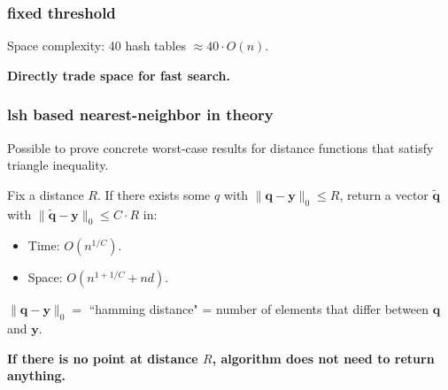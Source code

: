 \documentclass[compress]{beamer}
\newcommand{\bv}[1]{\mathbf{#1}}
\begin{document}
\begin{frame}
	\frametitle{fixed threshold}
	\begin{center}
	Space complexity: 40 hash tables \alert{$\approx 40\cdot O(n)$}. 
	
	\textbf{Directly trade space for fast search.}
	\end{center}
\end{frame}

\begin{frame}
	\frametitle{lsh based nearest-neighbor in theory}
	Possible to prove concrete worst-case results for distance functions that satisfy triangle inequality. 
	\begin{theorem}
		Fix a distance $R$. If there exists some $q$ with $\|\bv{q} - \bv{y}\|_0 \leq R$, return a vector $\tilde{\bv{q}}$ with $\|\tilde{\bv{q}} - \bv{y}\|_0 \leq C\cdot R$ in:
		\begin{itemize}
			\item Time: $O\left(n^{1/C}\right)$.
			\item Space: $O\left(n^{1 + 1/C} + nd\right)$. 
		\end{itemize}
	\end{theorem}
	$\|\bv{q} - \bv{y}\|_0 = $ ``hamming distance" = number of elements that differ between $\bv{q}$ and $\bv{y}$. 

	\begin{center}
	\textbf{\alert{If there is no point at distance $R$, algorithm does not need to return anything.}}
	\end{center}
\end{frame}
\end{document}
